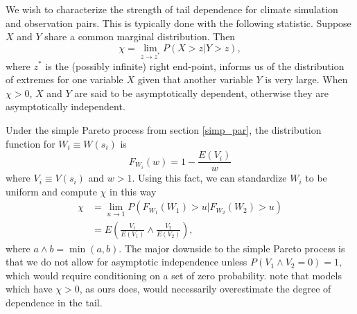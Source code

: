 We wish to characterize the strength of tail dependence for climate simulation and observation pairs. This is typically done with the following statistic. Suppose $X$ and $Y$ share a common marginal distribution. Then
\[ \chi = \lim_{z\rightarrow z^*} P(X>z| Y>z), \]
where $z^*$ is the (possibly infinite) right end-point, informs us of the distribution of extremes for one variable $X$ given that another variable $Y$ is very large. When $\chi>0$, $X$ and $Y$ are said to be asymptotically dependent, otherwise they are asymptotically independent.

Under the simple Pareto process from section \ref{simp_par}, the distribution function for $W_i\equiv W(s_i)$ is
\[ F_{W_i}(w) = 1 - \frac{E(V_i)}{w} \]
where $V_i\equiv V(s_i)$ and $w>1$. Using this fact, we can standardize $W_i$ to be uniform and compute $\chi$ in this way
\begin{align}
\chi &= \lim_{u\rightarrow 1} P(F_{W_1}(W_1) > u | F_{W_2}(W_2) > u) \nonumber \\
&= E\left(\frac{V_1}{E(V_1)} \wedge \frac{V_2}{E(V_2)}\right), \label{ppchi}
\end{align}
where $a \wedge b=\min(a,b)$. The major downside to the simple Pareto process is that we do not allow for asymptotic independence unless $P(V_1 \wedge V_2=0)=1$, which would require conditioning on a set of zero probability. \cite{coles1999dependence} note that models which have $\chi>0$, as ours does, would necessarily overestimate the degree of dependence in the tail.

